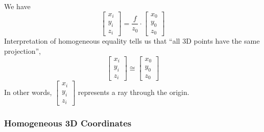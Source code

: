 We have \[
    \begin{bmatrix} x_i \\ y_i \\ z_i \end{bmatrix} = \frac{f}{z_0} \cdot \begin{bmatrix} x_0 \\ y_0 \\ z_0 \end{bmatrix}
\] Interpretation of homogeneous equality tells us that ``all 3D points have the same projection'', \[
    \begin{bmatrix} x_i \\ y_i \\ z_i \end{bmatrix} \cong \begin{bmatrix} x_0 \\ y_0 \\ z_0 \end{bmatrix}
\] In other words, $\begin{bmatrix} x_i \\ y_i \\ z_i \end{bmatrix}$ represents a ray through the origin. 

\subsubsection{Homogeneous 3D Coordinates}


